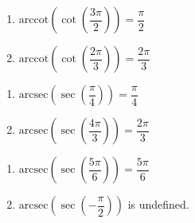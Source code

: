 \begin{multicols}{2}

\begin{enumerate}

\setcounter{enumi}{\value{HW}}

\item  $\text{arccot}\left(\cot\left(\dfrac{3\pi}{2}\right) \right) = \dfrac{\pi}{2}$
\item  $\text{arccot}\left(\cot\left(\dfrac{2\pi}{3}\right) \right) = \dfrac{2\pi}{3}$

\setcounter{HW}{\value{enumi}}

\end{enumerate}

\end{multicols}


\begin{multicols}{2}

\begin{enumerate}

\setcounter{enumi}{\value{HW}}

\item  $\text{arcsec}\left(\sec\left(\dfrac{\pi}{4}\right) \right) = \dfrac{\pi}{4}$ 
\item  $\text{arcsec}\left(\sec\left(\dfrac{4\pi}{3}\right) \right) = \dfrac{2\pi}{3}$

\setcounter{HW}{\value{enumi}}

\end{enumerate}

\end{multicols}

\begin{multicols}{2}

\begin{enumerate}

\setcounter{enumi}{\value{HW}}

\item  $\text{arcsec}\left(\sec\left( \dfrac{5\pi}{6} \right) \right) = \dfrac{5\pi}{6}$
\item  $\text{arcsec}\left(\sec\left(-\dfrac{\pi}{2} \right) \right)$ is undefined. 

\setcounter{HW}{\value{enumi}}

\end{enumerate}

\end{multicols}

